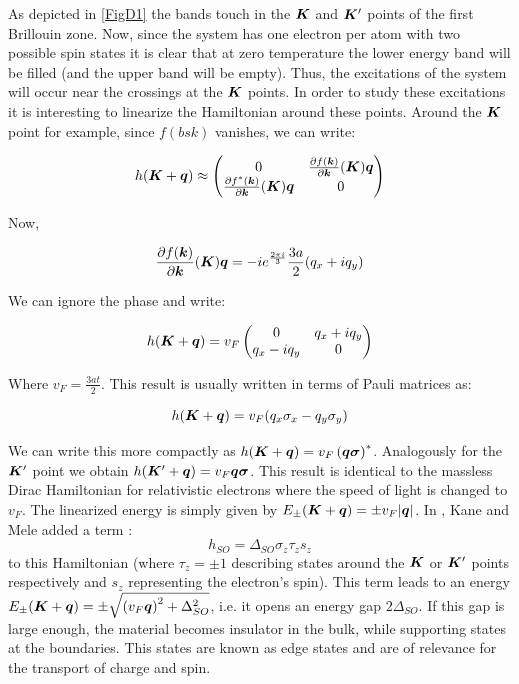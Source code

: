 As depicted in \ref{FigD1} the bands touch in the $\boldsymbol{K}$ and $\boldsymbol{K}'$ points of the first Brillouin zone. Now, since the system has one electron per atom with two possible spin states it is clear that at zero temperature the lower energy band will be filled (and the upper band will be empty). Thus, the excitations of the system will occur near the crossings at the $\boldsymbol{K}$ points. In order to study these excitations it is interesting to linearize the Hamiltonian around these points. Around the $\boldsymbol{K}$ point for example, since $f(bs{k})$ vanishes, we can write:

\begin{equation}
h(\boldsymbol{K}+\boldsymbol{q}) \approx \begin{pmatrix}
    0 & \frac{\partial f(\boldsymbol{k})}{\partial \boldsymbol{k}}(\boldsymbol{K})\boldsymbol{q} \\
    \frac{\partial f^*(\boldsymbol{k})}{\partial \boldsymbol{k}}(\boldsymbol{K})\boldsymbol{q} & 0
\end{pmatrix}
\end{equation}

Now, 

\begin{equation}
\frac{\partial f(\boldsymbol{k})}{\partial \boldsymbol{k}}(\boldsymbol{K})\boldsymbol{q} = -ie^{\frac{2\pi i}{3}} \frac{3a}{2}(q_x+iq_y)
\end{equation}

We can ignore the phase and write:

\begin{equation}
h(\boldsymbol{K}+\boldsymbol{q}) = v_F \begin{pmatrix}
    0 & q_x+iq_y \\
    q_x-iq_y & 0
\end{pmatrix}
\end{equation}

Where $v_F = \frac{3at}{2}$. This result is usually written in terms of Pauli matrices as:

\begin{equation}
h(\boldsymbol{K}+\boldsymbol{q}) = v_F(q_x\sigma_x-q_y\sigma_y)
\end{equation}

We can write this more compactly as $h(\boldsymbol{K}+\boldsymbol{q}) = v_F \left(\boldsymbol{q}\boldsymbol{\sigma}\right)^*$. Analogously for the $\boldsymbol{K}'$ point we obtain $h(\boldsymbol{K}'+\boldsymbol{q}) = v_F\boldsymbol{q}\boldsymbol{\sigma}$. This result is identical to the massless Dirac Hamiltonian for relativistic electrons where the speed of light is changed to $v_F$. The linearized energy is simply given by $E_{\pm}(\boldsymbol{K}+\boldsymbol{q}) = \pm v_F|\boldsymbol{q}|$. In \cite{Kane2005}, Kane and Mele added a term :
\begin{equation}
h_{SO} = \Delta_{SO}\sigma_z\tau_z s_z
\end{equation} 
to this Hamiltonian (where $\tau_z = \pm 1$ describing states around the $\boldsymbol{K}$ or $\boldsymbol{K}'$ points respectively and $s_z$ representing the electron's spin). This term leads to an energy $E_{\pm}(\boldsymbol{K}+\boldsymbol{q}) = \pm \sqrt{\left(v_F\boldsymbol{q} \right)^2 + \Delta_{SO}^2}$, i.e. it opens an energy gap $2\Delta_{SO}$. If this gap is large enough, the material becomes insulator in the bulk, while supporting states at the boundaries. This states are known as edge states and are of relevance for the transport of charge and spin.
